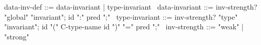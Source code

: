 \begin{syntax}
  data-inv-def ::= data-invariant | type-invariant
  \
  data-invariant ::= {inv-strength?} "global" "invariant";
                      id ":" pred ";"
  \
  type-invariant ::= {inv-strength?} "type" "invariant";
                      id "(" C-type-name id ")" "=" pred ";"
  \
  {inv-strength} ::= { "weak" } | { "strong" }
\end{syntax}
